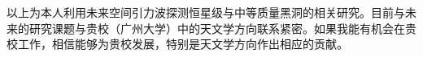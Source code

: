 \documentclass[12pt,a4paper,sans]{article}%
\begin{document}
\begin{CJK}{UTF8}{gbsn}
以上为本人利用未来空间引力波探测恒星级与中等质量黑洞的相关研究。目前与未来的研究课题与贵校（广州大学）中的天文学方向联系紧密。如果我能有机会在贵校工作，相信能够为贵校发展，特别是天文学方向作出相应的贡献。





%
\end{CJK}
\end{document}
